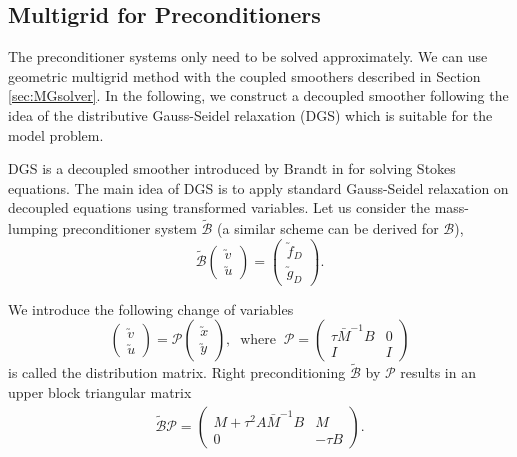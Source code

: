 \documentclass[smallcondensed]{svjour3}
\numberwithin{equation}{section} \numberwithin{table}{section}
\numberwithin{figure}{section}
\numberwithin{algorithm}{section}
\begin{document}
\subsection{Multigrid for Preconditioners}
\label{subsection:mg_dgs}
The preconditioner systems only need to be solved approximately. We can use geometric multigrid method with the coupled smoothers described in Section \ref{sec:MGsolver}. In the following, we construct a decoupled smoother following the idea of the distributive Gauss-Seidel relaxation (DGS) which is suitable for the model problem.

DGS is a decoupled smoother introduced by Brandt in \cite{brandt1979multi} for solving Stokes equations. The main idea of DGS is to apply standard Gauss-Seidel relaxation on decoupled equations using transformed variables. Let us consider the mass-lumping preconditioner system $\tilde{\mathcal{B}}$ (a similar scheme can be derived for $\mathcal{B}$),
\begin{equation}
\tilde{\mathcal{B}}
\left(
\begin{array}{c}
\utilde{v}\\
\utilde{u}
\end{array}
\right)
=\left(
\begin{array}{c}
\utilde{f}_D\\
\utilde{g}_D
\end{array}
\right).
\label{modified-preconditioner-system}
\end{equation}

We introduce the following change of variables
\begin{equation}
\left(
\begin{array}{c}
\utilde{v}\\
\utilde{u}
\end{array}
\right)
=\mathcal{P}
\left(
\begin{array}{c}
\utilde{x}\\
\utilde{y}
\end{array}
\right),\;\;\text{where}\;\;
\mathcal{P}
=\left(
\begin{array}{cc}
\tau\bar{M}^{-1}B & 0\\
I & I
\end{array}
\right)
\label{change-of-variables}
\end{equation}
is called the distribution matrix. Right preconditioning $\tilde{\mathcal{B}}$ by $\mathcal{P}$ results in an upper block triangular matrix
\begin{align*}
\tilde{\mathcal{B}}\mathcal{P}
=
\left(
\begin{array}{cc}
M+\tau^2A\bar M^{-1}B & M\\
 0 & -\tau B
\end{array}
\right).
\end{align*}
\end{document}
